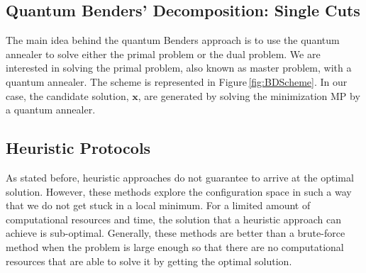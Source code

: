 \subsection{Quantum Benders' Decomposition: Single Cuts}
The main idea behind the quantum Benders approach is to use the quantum annealer to solve either the primal problem or the dual problem. We are interested in solving the primal problem, also known as master problem, with a quantum annealer. The scheme is represented in Figure\,\ref{fig:BDScheme}. In our case, the candidate solution, $\mathbf{x}$, are generated by solving the minimization MP by a quantum annealer.
\subsection{Heuristic Protocols}
As stated before, heuristic approaches do not guarantee to arrive at the optimal solution. However, these methods explore the configuration space in such a way that we do not get stuck in a local minimum. For a limited amount of computational resources and time, the solution that a heuristic approach can achieve is sub-optimal. Generally, these methods are better than a brute-force method when the problem is large enough so that there are no computational resources that are able to solve it by getting the optimal solution.
